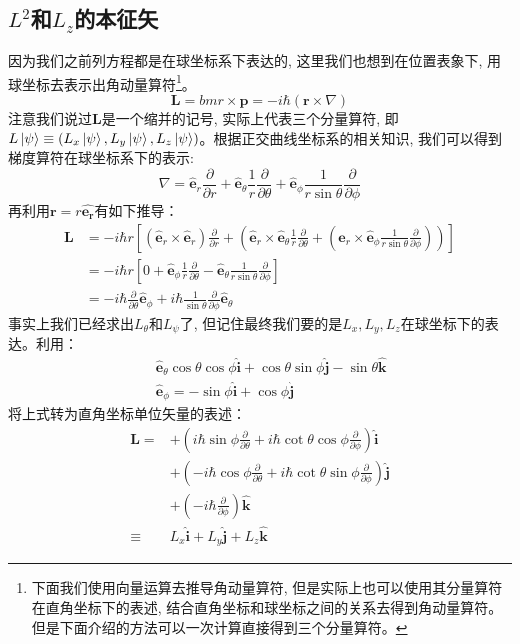 \documentclass[a4paper,zihao=-4,linespread=1]{ctexrep}
\begin{document}
    \subsection*{$L^2$和$L_z$的本征矢}
    因为我们之前列方程都是在球坐标系下表达的, 这里我们也想到在位置表象下, 用球坐标去表示出角动量算符\footnote{下面我们使用向量运算去推导角动量算符, 但是实际上也可以使用其分量算符在直角坐标下的表述, 结合直角坐标和球坐标之间的关系去得到角动量算符。但是下面介绍的方法可以一次计算直接得到三个分量算符。}。
    \[\bm{L}=bm{r}\times\bm{p}=-i\hbar\left(\bm{r}\times\nabla\right)\]
    注意我们说过$\bm{L}$是一个缩并的记号, 实际上代表三个分量算符, 即$L\ket{\psi}\equiv\left(L_x\ket{\psi},L_y\ket{\psi},L_z\ket{\psi}\right)$。根据正交曲线坐标系的相关知识, 我们可以得到梯度算符在球坐标系下的表示:
    \begin{equation}
        \nabla=\hat {\bm{e}}_r\frac{\partial}{\partial r}+\hat {\bm{e}}_\theta\frac{1}{r}\frac{\partial}{\partial \theta}+\hat {\bm{e}}_\phi\frac{1}{r\sin \theta}\frac{\partial}{\partial \phi}
    \end{equation}
    再利用$\bm{r}=r\hat{\bm{e_r}}$有如下推导：
    \begin{align*}
        \bm{L}&=-i\hbar r\left[\left(\hat{\bm{e}}_r\times \hat{\bm{e}}_r\right)\frac{\partial}{\partial r}+\left(\hat{\bm{e}}_r\times \hat{\bm{e}}_\theta\frac{1}{r}\frac{\partial}{\partial \theta}+\left(\hat{\bm{e}}_r\times\hat{\bm{e}}_\phi\frac{1}{r\sin\theta}\frac{\partial}{\partial\phi}\right)\right)\right]\\
              &=-i\hbar r\left[0+\hat{\bm{e}}_\phi\frac{1}{r}\frac{\partial}{\partial \theta}-\hat{\bm{e}}_\theta\frac{1}{r\sin\theta}\frac{\partial}{\partial\phi}\right]\\
              &=-i\hbar\frac{\partial}{\partial\theta}\hat{\bm{e}}_\phi+i\hbar\frac{1}{\sin\theta}\frac{\partial}{\partial\phi}\hat{\bm{e}}_\theta
    \end{align*}
    事实上我们已经求出$L_\theta$和$L_\psi$了, 但记住最终我们要的是$L_x,L_y,L_z$在球坐标下的表达。利用：
    \begin{eqnarray*}
        &&\hat{\bm{e}}_\theta\cos\theta\cos\phi\hat{\bm{i}}+\cos\theta\sin\phi\hat{\bm{j}}-\sin\theta\hat{\bm{k}}\\
        &&\hat{\bm{e}}_\phi=-\sin\phi\hat{\bm{i}}+\cos\phi\hat{\bm{j}}
    \end{eqnarray*}
    将上式转为直角坐标单位矢量的表述：
    \begin{align*}
        \bm{L}=&+\left(i\hbar\sin\phi\frac{\partial}{\partial\theta}+i\hbar\cot\theta\cos\phi\frac{\partial}{\partial\phi}\right)\hat{\bm{i}}\\
               &+\left(-i\hbar\cos\phi\frac{\partial}{\partial\theta}+i\hbar\cot\theta\sin\phi\frac{\partial}{\partial\phi}\right)\hat{\bm{j}}\\
               &+\left(-i\hbar\frac{\partial}{\partial\phi}\right)\hat{\bm{k}}\\
               \equiv& L_x\hat{\bm{i}}+L_y\hat{\bm{j}}+L_z\hat{\bm{k}}
    \end{align*}
\end{document}
